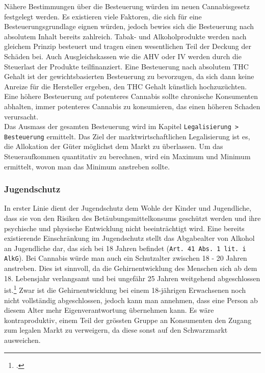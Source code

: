 \documentclass[../main.tex]{subfiles}
\begin{document}
	 \noindent
	 Nähere Bestimmungen über die Besteuerung würden im neuen Cannabisgesetz festgelegt werden.
	 Es existieren viele Faktoren, die sich für eine Besteuerungsgrundlage eignen würden, jedoch bewies sich die Besteuerung nach absolutem Inhalt bereits zahlreich.
	 Tabak- und Alkoholprodukte werden nach gleichem Prinzip besteuert und tragen einen wesentlichen Teil der Deckung der Schäden bei.
	 Auch Ausgleichskassen wie die AHV oder IV werden durch die Steuerlast der Produkte teilfinanziert.
	 Eine Besteuerung nach absolutem THC Gehalt ist der gewichtsbasierten Besteuerung zu bevorzugen, da sich dann keine Anreize für die Hersteller ergeben, den THC Gehalt künstlich hochzuzüchten.
	 Eine höhere Besteuerung auf potenteres Cannabis sollte chronische Konsumenten abhalten, immer potenteres Cannabis zu konsumieren, das einen höheren Schaden verursacht. \\
	 
	 \noindent
	 Das Ausmass der gesamten Besteuerung wird im Kapitel \texttt{Legalisierung > Besteuerung} ermittelt.
	 Das Ziel der marktwirtschaftlichen Legalisierung ist es, die Allokation der Güter möglichst dem Markt zu überlassen.
	 Um das Steueraufkommen quantitativ zu berechnen, wird ein Maximum und Minimum ermittelt, wovon man das Minimum anstreben sollte.
	 
	 
	 
	 \subsubsection{Jugendschutz}
	 In erster Linie dient der Jugendschutz dem Wohle der Kinder und Jugendliche, dass sie von den Risiken des Betäubungsmittelkonsums geschützt werden und ihre psychische und physische Entwicklung nicht beeinträchtigt wird. 
	 Eine bereits existierende Einschränkung im Jugendschutz stellt das Abgabealter von Alkohol an Jugendliche dar, das sich bei 18 Jahren befindet (\texttt{Art. 41 Abs. 1 lit. i AlkG}). 
	 Bei Cannabis würde man auch ein Schutzalter zwischen 18 - 20 Jahren anstreben. 
	 Dies ist sinnvoll, da die Gehirnentwicklung des Menschen sich ab dem 18. Lebensjahr verlangsamt und bei ungefähr 25 Jahren weitgehend abgeschlossen ist.\footcite{arain-2013}
	 Zwar ist die Gehirnentwicklung bei einem 18-jährigen Erwachsenen noch nicht vollständig abgeschlossen, jedoch kann man annehmen, dass eine Person ab diesem Alter mehr Eigenverantwortung übernehmen kann.
	 Es wäre kontraproduktiv, einem Teil der grössten Gruppe an Konsumenten den Zugang zum legalen Markt zu verweigern, da diese sonst auf den Schwarzmarkt ausweichen.\\
	 
\end{document}
